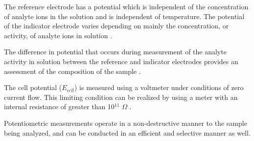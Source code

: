\documentclass[journal=jacsat,manuscript=article,layout=twocolumn]{achemso}
\begin{document}
The reference electrode has a potential which is
independent of the concentration of analyte ions in the solution and is
independent of temperature. The potential of the indicator electrode varies
depending on mainly the concentration, or activity, of analyte ions in solution
\cite{tartu}.

The difference in potential that occurs during measurement of the analyte
activity in solution between the reference and indicator electrodes provides an
assessment of the composition of the sample \cite{lab_man}.

The cell potential ($E_{cell}$) is measured using a voltmeter under
conditions of zero current flow. This limiting condition can be realized by
using a meter with an internal resistance of greater than 10$^{11}$ $\Omega$
\cite{nmt}.

Potentiometric measurements operate in a non-destructive manner to the sample being analyzed, and can be
conducted in an efficient and selective manner as well.
\end{document}
